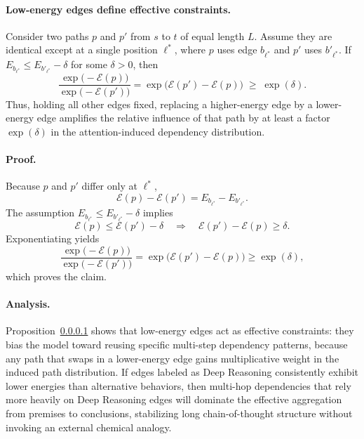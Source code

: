 \paragraph{Low-energy edges define effective constraints.}
\label{prop:low-energy-constraints}
Consider two paths \(p\) and \(p'\) from \(s\) to \(t\) of equal length \(L\).
Assume they are identical except at a single position \(\ell^\ast\), where \(p\) uses edge \(b_{\ell^\ast}\) and \(p'\) uses \(b'_{\ell^\ast}\).
If \(E_{b_{\ell^\ast}} \le E_{b'_{\ell^\ast}} - \delta\) for some \(\delta>0\), then
\begin{equation}
\frac{\exp \bigl(-\mathcal{E}(p)\bigr)}{\exp \bigl(-\mathcal{E}(p')\bigr)}
=
\exp \bigl(\mathcal{E}(p')-\mathcal{E}(p)\bigr)
\;\ge\;
\exp(\delta).
\end{equation}
Thus, holding all other edges fixed, replacing a higher-energy edge by a lower-energy edge amplifies the relative influence of that path by at least a factor \(\exp(\delta)\) in the attention-induced dependency distribution.

\paragraph{Proof.}
Because \(p\) and \(p'\) differ only at \(\ell^\ast\),
\begin{equation}
\mathcal{E}(p)-\mathcal{E}(p')
=
E_{b_{\ell^\ast}}-E_{b'_{\ell^\ast}}.
\end{equation}
The assumption \(E_{b_{\ell^\ast}} \le E_{b'_{\ell^\ast}} - \delta\) implies
\begin{equation}
\mathcal{E}(p)\le \mathcal{E}(p')-\delta
\quad\Rightarrow\quad
\mathcal{E}(p')-\mathcal{E}(p)\ge \delta.
\end{equation}
Exponentiating yields
\begin{equation}
\frac{\exp \bigl(-\mathcal{E}(p)\bigr)}{\exp \bigl(-\mathcal{E}(p')\bigr)}
=
\exp \bigl(\mathcal{E}(p')-\mathcal{E}(p)\bigr)
\ge
\exp(\delta),
\end{equation}
which proves the claim.

\paragraph{Analysis.}
Proposition~\ref{prop:low-energy-constraints} shows that low-energy edges act as effective constraints: they bias the model toward reusing specific multi-step dependency patterns, because any path that swaps in a lower-energy edge gains multiplicative weight in the induced path distribution.
If edges labeled as Deep Reasoning consistently exhibit lower energies than alternative behaviors, then multi-hop dependencies that rely more heavily on Deep Reasoning edges will dominate the effective aggregation from premises to conclusions, stabilizing long chain-of-thought structure without invoking an external chemical analogy.

